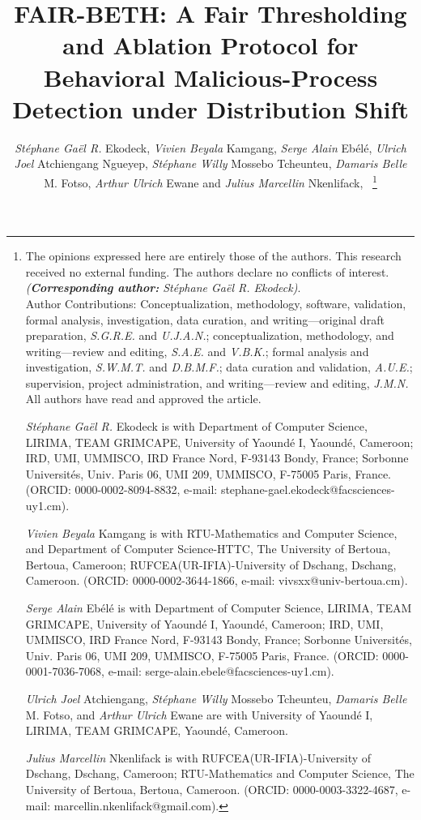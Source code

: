 \documentclass[journal]{IEEEtran}
\begin{document}
\title{FAIR-BETH: A Fair Thresholding and Ablation Protocol for Behavioral Malicious-Process Detection under Distribution Shift}

\author{\emph{St\'{e}phane Ga\"{e}l R.} Ekodeck, \emph{Vivien Beyala} Kamgang, \emph{Serge Alain} Eb\'{e}l\'{e}, \emph{Ulrich Joel} Atchiengang Ngueyep,  \emph{St\'{e}phane Willy} Mossebo Tcheunteu,  \emph{Damaris Belle} M. Fotso,  \emph{Arthur Ulrich} Ewane and \emph{Julius Marcellin} Nkenlifack,~
\thanks{The opinions expressed here are entirely those of the authors. This research received no external funding. The authors declare no conflicts of interest. \emph{(\textbf{Corresponding author:} St\'{e}phane Ga\"{e}l R. Ekodeck)}. \\
Author Contributions: Conceptualization, methodology, software, validation, formal analysis, investigation, data curation, and writing---original draft preparation, \emph{S.G.R.E.} and \emph{U.J.A.N.}; conceptualization, methodology, and writing---review and editing, \emph{S.A.E.} and \emph{V.B.K.}; formal analysis and investigation, \emph{S.W.M.T.} and \emph{D.B.M.F.}; data curation and validation, \emph{A.U.E.}; supervision, project administration, and writing---review and editing, \emph{J.M.N.} All authors have read and approved the article.
\par \emph{St\'{e}phane Ga\"{e}l R.} Ekodeck is with Department of Computer Science, LIRIMA, TEAM GRIMCAPE, University of Yaound\'{e} I, Yaound\'{e}, Cameroon; IRD, UMI, UMMISCO, IRD France Nord, F-93143 Bondy, France; Sorbonne Universit\'{e}s, Univ. Paris 06, UMI 209, UMMISCO, F-75005 Paris, France. (ORCID: 0000-0002-8094-8832, e-mail: stephane-gael.ekodeck@facsciences-uy1.cm).
\par \emph{Vivien Beyala} Kamgang is with RTU-Mathematics and Computer Science, and Department of Computer Science-HTTC, The University of Bertoua, Bertoua, Cameroon; RUFCEA(UR-IFIA)-University of Dschang, Dschang, Cameroon. (ORCID: 0000-0002-3644-1866, e-mail: vivsxx@univ-bertoua.cm).
\par \emph{Serge Alain} Eb\'{e}l\'{e} is with Department of Computer Science, LIRIMA, TEAM GRIMCAPE, University of Yaound\'{e} I, Yaound\'{e}, Cameroon; IRD, UMI, UMMISCO, IRD France Nord, F-93143 Bondy, France; Sorbonne Universit\'{e}s, Univ. Paris 06, UMI 209, UMMISCO, F-75005 Paris, France. (ORCID: 0000-0001-7036-7068, e-mail: serge-alain.ebele@facsciences-uy1.cm).
\par \emph{Ulrich Joel} Atchiengang, \emph{St\'{e}phane Willy} Mossebo Tcheunteu, \emph{Damaris Belle} M. Fotso, and \emph{Arthur Ulrich} Ewane are with University of Yaound\'{e} I, LIRIMA, TEAM GRIMCAPE, Yaound\'{e}, Cameroon.
\par \emph{Julius Marcellin} Nkenlifack is with RUFCEA(UR-IFIA)-University of Dschang, Dschang, Cameroon; RTU-Mathematics and Computer Science, The University of Bertoua, Bertoua, Cameroon. (ORCID: 0000-0003-3322-4687, e-mail: marcellin.nkenlifack@gmail.com).}}
\end{document}
